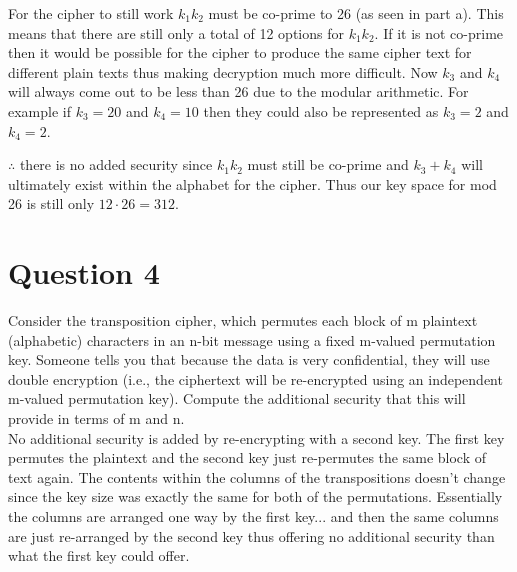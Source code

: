 \documentclass[fleqn, 12pt]{article}
\begin{document}
\begin{enumerate}[a)]
        For the cipher to still work $k_1k_2$ must be co-prime to 26 (as seen in part a). This means that there are still only a total of 12 options for $k_1k_2$. If it is not co-prime then it would be possible for the cipher to produce the same cipher text for different plain texts thus making decryption much more difficult. Now $k_3$ and $k_4$ will always come out to be less than 26 due to the modular arithmetic. For example if $k_3 = 20$ and $k_4 = 10$ then they could also be represented as $k_3=2$ and $k_4=2$.
        
        $\therefore$ there is no added security since $k_1k_2$ must still be co-prime and $k_3 + k_4$ will ultimately exist within the alphabet for the cipher. Thus our key space for mod 26 is still only $12 \cdot 26 = 312$.
\end{enumerate}

\newpage

\section*{Question 4}

Consider the transposition cipher, which permutes each block of m plaintext (alphabetic) characters in an n-bit message using a fixed m-valued permutation key. Someone tells you that because the data is very confidential, they will use double encryption (i.e., the ciphertext will be re-encrypted using an independent m-valued permutation key). Compute the additional security that this will provide in terms of m and n.\\

No additional security is added by re-encrypting with a second key. The first key permutes the plaintext and the second key just re-permutes the same block of text again. The contents within the columns of the transpositions doesn't change since the key size was exactly the same for both of the permutations. Essentially the columns are arranged one way by the first key... and then the same columns are just re-arranged by the second key thus offering no additional security than what the first key could offer.
\end{document}
